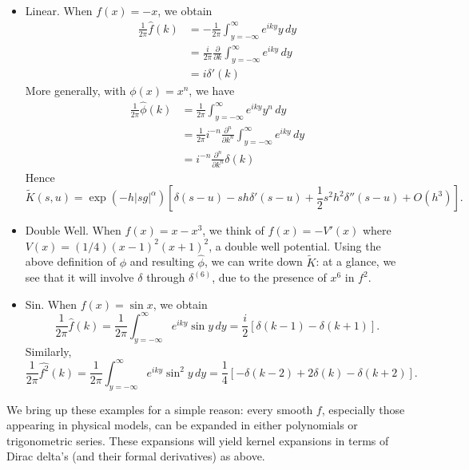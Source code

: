 \documentclass[11pt,letterpaper]{article}
\begin{document}
\begin{itemize}
\item Linear.  When $f(x) = -x$, we obtain 
\begin{align}
\frac{1}{2 \pi} \widehat{f}(k) &= - \frac{1}{2 \pi} \int_{y=-\infty}^\infty e^{i k y} y \, dy \nonumber \\
 &= \frac{i}{2 \pi} \frac{\partial}{\partial k} \int_{y=-\infty}^\infty e^{i k y} \, dy \nonumber \\
 &= i \delta'(k)
 \label{eqn:ft1}
 \end{align}
More generally, with $\phi(x) = x^n$, we have
\begin{align}
\frac{1}{2 \pi} \widehat{\phi}(k) &= \frac{1}{2 \pi} \int_{y=-\infty}^\infty e^{i k y} y^n \, dy \nonumber \\
 &= \frac{1}{2 \pi} i^{-n} \frac{\partial^n}{\partial k^n} \int_{y=-\infty}^\infty e^{i k y} \, dy \nonumber \\
 \label{eqn:ftx}
 &= i^{-n} \frac{\partial^n}{\partial k^n} \delta(k)
 \end{align}
Hence
\[
\widetilde{K}(s,u) =  \exp{\left(  -h |s g|^{\alpha} \right)} \left[ \delta(s-u) - s h \delta'(s-u) + \frac{1}{2} s^2 h^2 \delta''(s-u) + O(h^3) \right].
\]
\item Double Well.  When $f(x) = x - x^3$, we think of $f(x) = -V'(x)$ where $V(x) = (1/4) (x-1)^2 (x+1)^2$, a double well potential.  Using the above definition of $\phi$ and resulting $\widehat{\phi}$, we can write down $\widetilde{K}$: at a glance, we see that it will involve $\delta$ through $\delta^{(6)}$, due to the presence of $x^6$ in $f^2$.
\item Sin. When $f(x) = \sin x$, we obtain
\begin{equation}
\label{eqn:sinhat}
\frac{1}{2 \pi} \widehat{f}(k) = \frac{1}{2 \pi} \int_{y=-\infty}^\infty e^{i k y} \sin y \, dy = \frac{i}{2} \left[ \delta(k-1) - \delta(k+1) \right].
\end{equation}
Similarly,
\begin{equation}
\label{eqn:sinsqhat}
\frac{1}{2 \pi} \widehat{f^2}(k) = \frac{1}{2 \pi} \int_{y=-\infty}^\infty e^{i k y} \sin^2 y \, dy = \frac{1}{4} \left[ -\delta(k-2) + 2 \delta(k) - \delta(k+2) \right].
\end{equation}
\end{itemize}
We bring up these examples for a simple reason: every smooth $f$, especially those appearing in physical models, can be expanded in either polynomials or trigonometric series.  These expansions will yield kernel expansions in terms of Dirac delta's (and their formal derivatives) as above.
\end{document}
